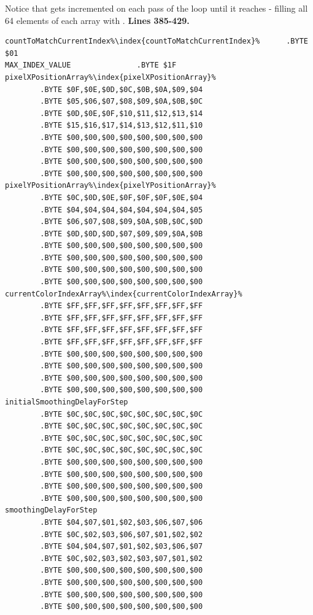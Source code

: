 Notice that  gets incremented on each pass of the loop until it reaches  - filling all 64 elements of each array with
.
\clearpage
\textbf{Lines 385-429. }
\begin{lstlisting}[escapechar=\%,caption = The pixel buffers\, each 64 bytes long though only 32 bytes are used in this version thanks to \icode{MAX\_INDEX\_VALUE}
being set to \icode{\$1F} (32).]
countToMatchCurrentIndex%\index{countToMatchCurrentIndex}%      .BYTE $01
MAX_INDEX_VALUE               .BYTE $1F
pixelXPositionArray%\index{pixelXPositionArray}%   
        .BYTE $0F,$0E,$0D,$0C,$0B,$0A,$09,$04
        .BYTE $05,$06,$07,$08,$09,$0A,$0B,$0C
        .BYTE $0D,$0E,$0F,$10,$11,$12,$13,$14
        .BYTE $15,$16,$17,$14,$13,$12,$11,$10
        .BYTE $00,$00,$00,$00,$00,$00,$00,$00
        .BYTE $00,$00,$00,$00,$00,$00,$00,$00
        .BYTE $00,$00,$00,$00,$00,$00,$00,$00
        .BYTE $00,$00,$00,$00,$00,$00,$00,$00
pixelYPositionArray%\index{pixelYPositionArray}%   
        .BYTE $0C,$0D,$0E,$0F,$0F,$0F,$0E,$04
        .BYTE $04,$04,$04,$04,$04,$04,$04,$05
        .BYTE $06,$07,$08,$09,$0A,$0B,$0C,$0D
        .BYTE $0D,$0D,$0D,$07,$09,$09,$0A,$0B
        .BYTE $00,$00,$00,$00,$00,$00,$00,$00
        .BYTE $00,$00,$00,$00,$00,$00,$00,$00
        .BYTE $00,$00,$00,$00,$00,$00,$00,$00
        .BYTE $00,$00,$00,$00,$00,$00,$00,$00
currentColorIndexArray%\index{currentColorIndexArray}%   
        .BYTE $FF,$FF,$FF,$FF,$FF,$FF,$FF,$FF
        .BYTE $FF,$FF,$FF,$FF,$FF,$FF,$FF,$FF
        .BYTE $FF,$FF,$FF,$FF,$FF,$FF,$FF,$FF
        .BYTE $FF,$FF,$FF,$FF,$FF,$FF,$FF,$FF
        .BYTE $00,$00,$00,$00,$00,$00,$00,$00
        .BYTE $00,$00,$00,$00,$00,$00,$00,$00
        .BYTE $00,$00,$00,$00,$00,$00,$00,$00
        .BYTE $00,$00,$00,$00,$00,$00,$00,$00
initialSmoothingDelayForStep   
        .BYTE $0C,$0C,$0C,$0C,$0C,$0C,$0C,$0C
        .BYTE $0C,$0C,$0C,$0C,$0C,$0C,$0C,$0C
        .BYTE $0C,$0C,$0C,$0C,$0C,$0C,$0C,$0C
        .BYTE $0C,$0C,$0C,$0C,$0C,$0C,$0C,$0C
        .BYTE $00,$00,$00,$00,$00,$00,$00,$00
        .BYTE $00,$00,$00,$00,$00,$00,$00,$00
        .BYTE $00,$00,$00,$00,$00,$00,$00,$00
        .BYTE $00,$00,$00,$00,$00,$00,$00,$00
smoothingDelayForStep   
        .BYTE $04,$07,$01,$02,$03,$06,$07,$06
        .BYTE $0C,$02,$03,$06,$07,$01,$02,$02
        .BYTE $04,$04,$07,$01,$02,$03,$06,$07
        .BYTE $0C,$02,$03,$02,$03,$07,$01,$02
        .BYTE $00,$00,$00,$00,$00,$00,$00,$00
        .BYTE $00,$00,$00,$00,$00,$00,$00,$00
        .BYTE $00,$00,$00,$00,$00,$00,$00,$00
        .BYTE $00,$00,$00,$00,$00,$00,$00,$00


\end{lstlisting}
\clearpage

